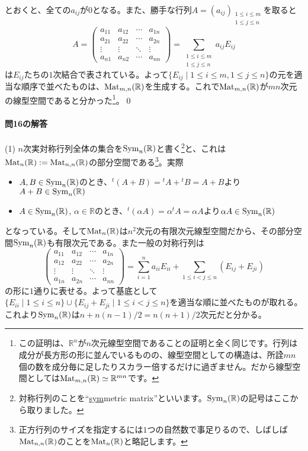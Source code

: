 とおくと、全ての$a_{ij}$が$0$となる。また、勝手な行列$A = (a_{ij})_{\substack{1\leq i\leq m\\ 1\leq j\leq n}}$を取ると
\[
A = 
\begin{pmatrix}
a_{11} & a_{12} & \cdots & a_{1n} \\
a_{21} & a_{22} & \cdots & a_{2n} \\
\vdots & \vdots & \ddots & \vdots \\
a_{n1} & a_{n2} & \cdots & a_{nn}
\end{pmatrix}
= \sum_{\substack{1 \leq i \leq m \\ 1 \leq j \leq n}} a_{ij} E_{ij}
\]
は$E_{ij}$たちの$1$次結合で表されている。よって$\{E_{ij}\mid 1\leq i \leq m, 1\leq j \leq n\}$の元を適当な順序で並べたものは、$\operatorname{Mat}_{m, n}(\mathbb{R})$を生成する。これで$\operatorname{Mat}_{m, n}(\mathbb{R})$が$mn$次元の線型空間であると分かった\footnote{この証明は、$\mathbb{R}^n$が$n$次元線型空間であることの証明と全く同じです。行列は成分が長方形の形に並んでいるものの、線型空間としての構造は、所詮$mn$個の数を成分毎に足したりスカラー倍するだけに過ぎません。だから線型空間としては$\operatorname{Mat}_{m, n}(\mathbb{R})\simeq\mathbb{R}^{mn}$です。}。\qed

\paragraph{問16の解答} 

(1) $n$次実対称行列全体の集合を$\operatorname{Sym}_n(\mathbb{R})$と書く\footnote{対称行列のことを``\uline{sym}metric matrix''といいます。$\operatorname{Sym}_n(\mathbb{R})$の記号はここから取りました。}と、これは$\operatorname{Mat}_n(\mathbb{R}) := \operatorname{Mat}_{n, n}(\mathbb{R})$の部分空間である\footnote{正方行列のサイズを指定するには$1$つの自然数で事足りるので、しばしば$\operatorname{Mat}_{n, n}(\mathbb{R})$のことを$\operatorname{Mat}_n(\mathbb{R})$と略記します。}。実際
\begin{itemize}
\item $A, B \in \operatorname{Sym}_n(\mathbb{R})$のとき、${}^t(A + B) = {}^t A + {}^t B = A + B$より$A + B \in \operatorname{Sym}_n(\mathbb{R})$
\item $A \in \operatorname{Sym}_n(\mathbb{R})$, $\alpha \in \mathbb{R}$のとき、${}^t(\alpha A) = \alpha {}^t A = \alpha A$より$\alpha A\in\operatorname{Sym}_n(\mathbb{R})$
\end{itemize}
となっている。そして$\operatorname{Mat}_n(\mathbb{R})$は$n^2$次元の有限次元線型空間だから、その部分空間$\operatorname{Sym}_n(\mathbb{R})$も有限次元である。また一般の対称行列は
\[
\begin{pmatrix}
a_{11} & a_{12} & \cdots & a_{1n} \\
a_{12} & a_{22} & \cdots & a_{2n} \\
\vdots & \vdots & \ddots & \vdots \\
a_{1n} & a_{2n} & \cdots & a_{nn}
\end{pmatrix}
=
\sum_{i = 1}^n a_{ii} E_{ii} + \sum_{1\leq i < j \leq n}(E_{ij} + E_{ji})
\]
の形に$1$通りに表せる。よって基底として$\{E_{ii}\mid 1\leq i \leq n\}\cup\{E_{ij} + E_{ji} \mid 1 \leq i < j \leq n \}$を適当な順に並べたものが取れる。これより$\operatorname{Sym}_n(\mathbb{R})$は$n + n(n - 1)/2 = n(n + 1)/2$次元だと分かる。

